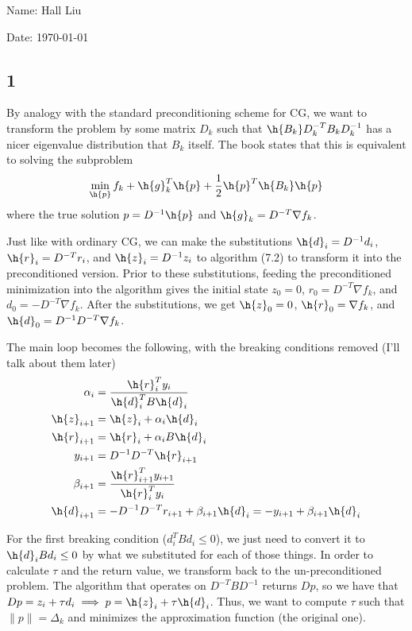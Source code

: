 \documentclass{article}
\begin{document}
Name: Hall Liu

Date: \today 
\vspace{1.5cm}
\subsection*{1}
By analogy with the standard preconditioning scheme for CG, we want to transform the problem by some matrix $D_k$ such that $\h{B_k}D_k^{-T}B_kD_k^{-1}$ has a nicer eigenvalue distribution that $B_k$ itself. The book states that this is equivalent to solving the subproblem 
\[\min_{\h{p}} f_k+\h{g}_k^T\h{p}+\frac{1}{2}\h{p}^T\h{B_k}\h{p}\]
where the true solution $p=D^{-1}\h{p}$ and $\h{g}_k=D^{-T}\nabla f_k$. 

Just like with ordinary CG, we can make the substitutions $\h{d}_i=D^{-1}d_i$, $\h{r}_i=D^{-T}r_i$, and $\h{z}_i=D^{-1}z_i$ to algorithm (7.2) to transform it into the preconditioned version. Prior to these substitutions, feeding the preconditioned minimization into the algorithm gives the initial state $z_0=0$, $r_0=D^{-T}\nabla f_k$, and $d_0=-D^{-T}\nabla f_k$. After the substitutions, we get $\h{z}_0=0$, $\h{r}_0=\nabla f_k$, and $\h{d}_0=D^{-1}D^{-T}\nabla f_k$. 

The main loop becomes the following, with the breaking conditions removed (I'll talk about them later)
\begin{align*}
    \alpha_i&=\frac{\h{r}_i^Ty_i}{\h{d}_i^TB\h{d}_i}\\
    \h{z}_{i+1}&=\h{z}_i+\alpha_i\h{d}_i\\
    \h{r}_{i+1}&=\h{r}_i+\alpha_iB\h{d}_i\\
    y_{i+1}&=D^{-1}D^{-T}\h{r}_{i+1}\\
    \beta_{i+1}&=\frac{\h{r}_{i+1}^Ty_{i+1}}{\h{r}_i^Ty_i}\\
    \h{d}_{i+1}&=-D^{-1}D^{-T}r_{i+1}+\beta_{i+1}\h{d}_i=-y_{i+1}+\beta_{i+1}\h{d}_i\\
\end{align*}

For the first breaking condition ($d_i^TBd_i\leq0$), we just need to convert it to $\h{d}_iBd_i\leq0$ by what we substituted for each of those things. In order to calculate $\tau$ and the return value, we transform back to the un-preconditioned problem. The algorithm that operates on $D^{-T}BD^{-1}$ returns $Dp$, so we have that $Dp=z_i+\tau d_i\implies p=\h{z}_i+\tau\h{d}_i$. Thus, we want to compute $\tau$ such that $\|p\|=\Delta_k$ and minimizes the approximation function (the original one).
\end{document}
